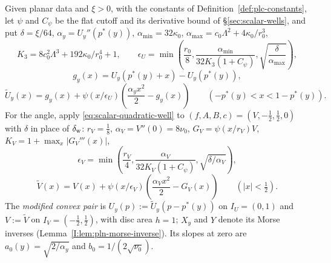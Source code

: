 \begin{definition}\label{def:plc-data}
Given planar data and $\xi>0$, with the constants of Definition~\ref{def:plc-constants}, let $\psi$ and $C_\psi$ be the
flat cutoff and its derivative bound of \S\ref{sec:scalar-wells}, and put $\delta=\xi/64$,
$\alpha_y=U_y''(p^*(y))$, $\alpha_{\min}=32\kappa_0$, $\alpha_{\max}=c_0\Lambda^2+4\kappa_0/r_0^3$,
\[
 K_3=8c_0^2\Lambda^3+192\kappa_0/r_0^4+1,\qquad
 \epsilon_U=\min\left(\frac{r_0}8,
 \frac{\alpha_{\min}}{32K_3(1+C_\psi)},\sqrt{\frac\delta{\alpha_{\max}}}\right),
\]
\[
 g_y(x)=U_y(p^*(y)+x)-U_y(p^*(y)),\]\[
 \widetilde U_y(x)=g_y(x)+\psi(x/\epsilon_U)
       \left(\frac{\alpha_yx^2}2-g_y(x)\right)\qquad(-p^*(y)<x<1-p^*(y)).
\]
For the angle, apply \eqref{eq:scalar-quadratic-well} to $(f,A,B,c)=(V,-\frac12,\frac12,0)$ with $\delta$ in place of
$\delta_{\rm w}$: $r_V=\frac18$, $\alpha_V=V''(0)=8\nu_0$, $G_V=\psi(x/r_V)V$, $K_V=1+\max_x|G_V'''(x)|$,
\[
 \epsilon_V=\min\left(\frac{r_V}4,
 \frac{\alpha_V}{32K_V(1+C_\psi)},\sqrt{\delta/\alpha_V}\right),\]\[
 \widetilde V(x)=V(x)+\psi(x/\epsilon_V)
       \left(\frac{\alpha_Vx^2}2-G_V(x)\right)\qquad(|x|<\tfrac12).
\]
The \emph{modified convex pair} is $U_y(p):=\widetilde U_y(p-p^*(y))$ on $I_U=(0,1)$ and $V:=\widetilde V$ on
$I_V=(-\frac12,\frac12)$, with disc area $h=1$; $X_y$ and $Y$ denote its Morse inverses
(Lemma~\ref{I:lem:pln-morse-inverse}). Its slopes at zero are $a_0(y)=\sqrt{2/\alpha_y}$ and $b_0=1/(2\sqrt{\nu_0})$.


\end{definition}
